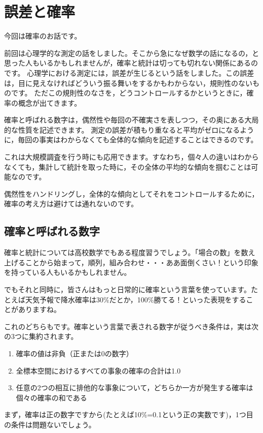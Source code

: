\documentclass{ltjbook}
\begin{document}
\VerbatimFootnotes
\chapter{誤差と確率}
\label{m07_probability}
今回は確率のお話です。

前回は心理学的な測定の話をしました。そこから急になぜ数学の話になるの，と思った人もいるかもしれませんが，確率と統計は切っても切れない関係にあるのです。
心理学における測定には，誤差が生じるという話をしました。この誤差は，目に見えなければどういう振る舞いをするかもわからない，規則性のないものです。
ただこの規則性のなさを，どうコントロールするかというときに，確率の概念が出てきます。

確率と呼ばれる数字は，偶然性や毎回の不確実さを表しつつ，その奥にある大局的な性質を記述できます。
測定の誤差が積もり重なると平均がゼロになるように，毎回の事実はわからなくても全体的な傾向を記述することはできるのです。

これは大規模調査を行う時にも応用できます。すなわち，個々人の違いはわからなくても，集計して統計を取った時に，その全体の平均的な傾向を掴むことは可能なのです。

偶然性をハンドリングし，全体的な傾向としてそれをコントロールするために，確率の考え方は避けては通れないのです。

\section{確率と呼ばれる数字}
確率と統計については高校数学でもある程度習うでしょう。「場合の数」を数え上げることから始まって，順列，組み合わせ・・・ああ面倒くさい！という印象を持っている人もいるかもしれません。

でもそれと同時に，皆さんはもっと日常的に確率という言葉を使っています。たとえば天気予報で降水確率は30\%だとか，100\%勝てる！といった表現をすることがありますね。

これのどちらもです。確率という言葉で表される数字が従うべき条件は，実は次の3つに集約されます。
\begin{enumerate}
	\item 確率の値は非負（正または0の数字）
	\item 全標本空間におけるすべての事象の確率の合計は1.0
	\item 任意の2つの相互に排他的な事象について，どちらか一方が発生する確率は個々の確率の和である
\end{enumerate}

まず，確率は正の数字ですから(たとえば10\%=0.1という正の実数です)，1つ目の条件は問題ないでしょう。
\end{document}
